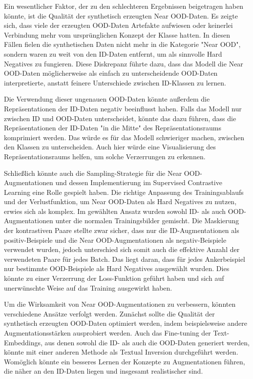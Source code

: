 Ein wesentlicher Faktor, der zu den schlechteren Ergebnissen beigetragen haben könnte, ist die Qualität der synthetisch erzeugten Near OOD-Daten. Es zeigte sich, dass viele der erzeugten OOD-Daten Artefakte aufwiesen oder keinerlei Verbindung mehr vom ursprünglichen Konzept der Klasse hatten. In diesen Fällen fielen die synthetischen Daten nicht mehr in die Kategorie "Near OOD", sondern waren zu weit von den ID-Daten entfernt, um als sinnvolle Hard Negatives zu fungieren. Diese Diskrepanz führte dazu, dass das Modell die Near OOD-Daten möglicherweise als einfach zu unterscheidende OOD-Daten interpretierte, anstatt feinere Unterschiede zwischen ID-Klassen zu lernen.

Die Verwendung dieser ungenauen OOD-Daten könnte außerdem die Repräsentationen der ID-Daten negativ beeinflusst haben. Falls das Modell nur zwischen ID und OOD-Daten unterscheidet, könnte das dazu führen, dass die Repräsentationen der ID-Daten "in die Mitte" des Repräsentationsraums komprimiert werden. Das würde es für das Modell schwieriger machen, zwischen den Klassen zu unterscheiden. Auch hier würde eine Visualisierung des Repräsentationsraums helfen, um solche Verzerrungen zu erkennen.

Schließlich könnte auch die Sampling-Strategie für die Near OOD-Augmentationen und dessen Implementierung im Supervised Contrastive Learning eine Rolle gespielt haben. Die richtige Anpassung des Trainingsablaufs und der Verlustfunktion, um Near OOD-Daten als Hard Negatives zu nutzen, erwies sich als komplex. Im gewählten Ansatz wurden sowohl ID- als auch OOD-Augmentationen unter die normalen Trainingsbilder gemischt. Die Maskierung der kontrastiven Paare stellte zwar sicher, dass nur die ID-Augmentationen als positiv-Beispiele und die Near OOD-Augmentationen als negativ-Beispiele verwendet wurden, jedoch unterschied sich somit auch die effektive Anzahl der verwendeten Paare für jedes Batch. Das liegt daran, dass für jedes Ankerbeispiel nur bestimmte OOD-Beispiele als Hard Negatives ausgewählt wurden. Dies könnte zu einer Verzerrung der Loss-Funktion geführt haben und sich auf unerwünschte Weise auf das Training ausgewirkt haben.

Um die Wirksamkeit von Near OOD-Augmentationen zu verbessern, könnten verschiedene Ansätze verfolgt werden. Zunächst sollte die Qualität der synthetisch erzeugten OOD-Daten optimiert werden, indem beispielsweise andere Augmentationsstärken ausprobiert werden. Auch das Fine-tuning der Text-Embeddings, aus denen sowohl die ID- als auch die OOD-Daten generiert werden, könnte mit einer anderen Methode als Textual Inversion durchgeführt werden. Womöglich könnte ein besseres Lernen der Konzepte zu Augmentationen führen, die näher an den ID-Daten liegen und insgesamt realistischer sind.

